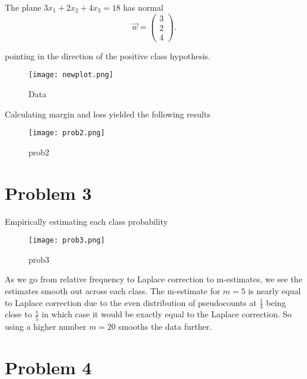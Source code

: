 The plane $3x_{1}+2x_{2}+4x_{3}=18$ has normal
\[
\vec{w} = \begin{pmatrix}
  3 \\
  2 \\
  4
\end{pmatrix}
.\] 

pointing in the direction of the positive class hypothesis.
\begin{figure}[H]
  \centering
  \texttt{[image: newplot.png]}
  \caption{Data}%
  \label{fig:Data}
\end{figure}

Calculating margin and loss yielded the following results

\begin{figure}[H]
  \centering
  \texttt{[image: prob2.png]}
  \caption{prob2}%
  \label{fig:prob2}
\end{figure}

\section{Problem 3}%

Empirically estimating each class probability

\begin{figure}[H]
  \centering
  \texttt{[image: prob3.png]}
  \caption{prob3}%
  \label{fig:prob3}
\end{figure}

As we go from relative frequency to Laplace correction to m-estimates, we see
the estimates smooth out across each class. The m-estimate for $m=5$ is nearly
equal to Laplace correction due to the even distribution of pseudocounts at
$\frac{1}{4}$ being close to $\frac{1}{5}$ in which case it would be exactly
equal to the Laplace correction. So using a higher number $m = 20$ smooths
the data further.

\section{Problem 4}%

